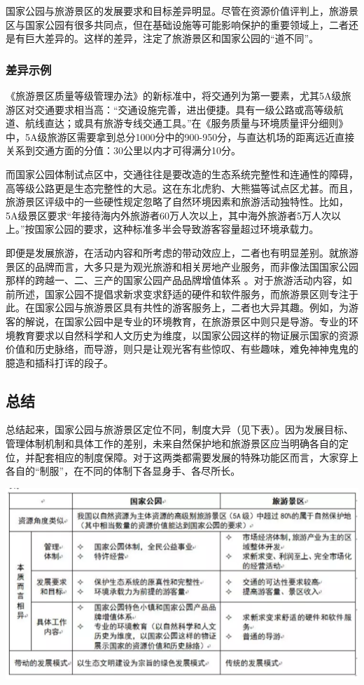 \documentclass[]{book}
\begin{document}
国家公园与旅游景区的发展要求和目标差异明显。尽管在资源价值评判上，旅游景区与国家公园有很多共同点，但在基础设施等可能影响保护的重要领域上，二者还是有巨大差异的。这样的差异，注定了旅游景区和国家公园的``道不同''。

\hypertarget{ux5deeux5f02ux793aux4f8b}{%
\subsubsection{差异示例}\label{ux5deeux5f02ux793aux4f8b}}

《旅游景区质量等级管理办法》的新标准中，将交通列为第一要素，尤其5A级旅游区对交通要求相当高：``交通设施完善，进出便捷。具有一级公路或高等级航道、航线直达；或具有旅游专线交通工具。''在《服务质量与环境质量评分细则》中，5A级旅游区需要拿到总分1000分中的900-950分，与直达机场的距离远近直接关系到交通方面的分值：30公里以内才可得满分10分。

而国家公园体制试点区中，交通往往是要改造的生态系统完整性和连通性的障碍，高等级公路更是生态完整性的大忌。这在东北虎豹、大熊猫等试点区尤甚。而且，旅游景区评级中的一些硬性规定忽略了自然环境因素和旅游活动独特性。比如，5A级景区要求``年接待海内外旅游者60万人次以上，其中海外旅游者5万人次以上。''按国家公园的要求，这种标准多半会导致游客容量超过环境承载力。

即便是发展旅游，在活动内容和所考虑的带动效应上，二者也有明显差别。就旅游景区的品牌而言，大多只是为观光旅游和相关房地产业服务，而非像法国国家公园那样的跨越一、二、三产的国家公园产品品牌增值体系 。对于旅游活动内容，如前所述，国家公园不提倡求新求变求舒适的硬件和软件服务，而旅游景区则专注于此。在国家公园与旅游景区具有共性的游客服务上，二者也大异其趣。例如，为游客的解说，在国家公园中是专业的环境教育，在旅游景区中则只是导游。专业的环境教育要求以自然科学和人文历史为维度，以国家公园这样的物证展示国家的资源价值和历史脉络，而导游，则只是让观光客有些惊叹、有些趣味，难免神神鬼鬼的臆造和插科打诨的段子。

\hypertarget{ux603bux7ed3}{%
\subsection{总结}\label{ux603bux7ed3}}

总结起来，国家公园与旅游景区定位不同，制度大异（见下表）。因为发展目标、管理体制机制和具体工作的差别，未来自然保护地和旅游景区应当明确各自的定位，并配套相应的制度保障。对于这两类都需要发展的特殊功能区而言，大家穿上各自的``制服''，在不同的体制下各显身手、各尽所长。

\includegraphics[width=8.33in]{images/park6}
\end{document}
